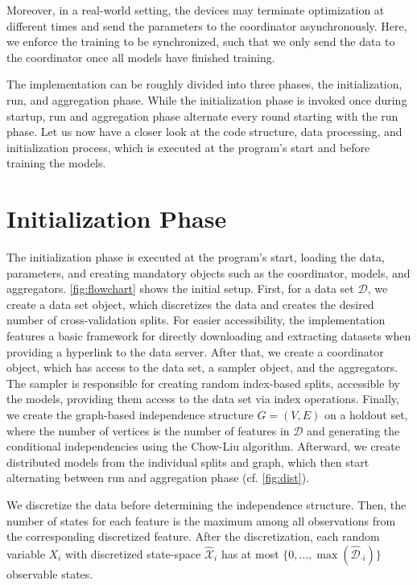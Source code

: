 Moreover, in a real-world setting, the devices may terminate optimization at different times and send the parameters to the coordinator asynchronously. 
Here, we enforce the training to be synchronized, such that we only send the data to the coordinator once all models have finished training.

The implementation can be roughly divided into three phases, the initialization, run, and aggregation phase.
While the initialization phase is invoked once during startup, run and aggregation phase alternate every round starting with the run phase.
Let us now have a closer look at the code structure, data processing, and initialization process, which is executed at the program's start and before training the models. 

\section{Initialization Phase}

The initialization phase is executed at the program's start, loading the data, parameters, and creating mandatory objects such as the coordinator, models, and aggregators.
\autoref{fig:flowchart} shows the initial setup.
First, for a data set $\mathcal{D}$, we create a data set object, which discretizes the data and creates the desired number of cross-validation splits. 
For easier accessibility, the implementation features a basic framework for directly downloading and extracting datasets when providing a hyperlink to the data server.
After that, we create a coordinator object, which has access to the data set, a sampler object, and the aggregators.
The sampler is responsible for creating random index-based splits, accessible by the models, providing them access to the data set via index operations.
Finally, we create the graph-based independence structure $G=(V,E)$  on a holdout set, where the number of vertices is the number of features in $\mathcal{D}$ and generating the conditional independencies using the Chow-Liu algorithm.
Afterward, we create distributed models from the individual splits and graph, which then start alternating between run and aggregation phase (cf. \autoref{fig:dist}).

We discretize the data before determining the independence structure. Then, the number of states for each feature is the maximum among all observations from the corresponding discretized feature. 
After the discretization, each random variable $X_i$ with discretized state-space $\hat{\mathcal{X}}_i$ has at most $\{0, \ldots, \max(\hat{\mathcal{D}}_{\cdot i})\}$ observable states.

